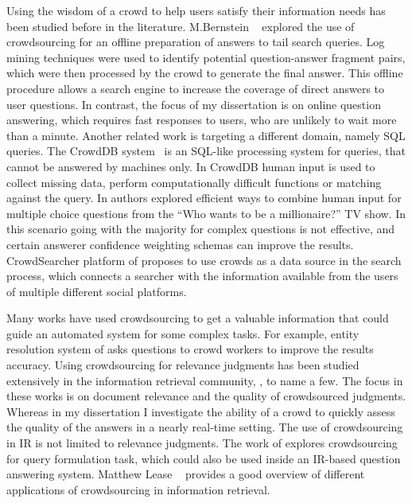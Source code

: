 Using the wisdom of a crowd to help users satisfy their information needs has been studied before in the literature.
M.Bernstein \etal~\cite{bernstein2012direct} explored the use of crowdsourcing for an offline preparation of answers to tail search queries.
Log mining techniques were used to identify potential question-answer fragment pairs, which were then processed by the crowd to generate the final answer.
This offline procedure allows a search engine to increase the coverage of direct answers to user questions.
In contrast, the focus of my dissertation is on online question answering, which requires fast responses to users, who are unlikely to wait more than a minute.
Another related work is targeting a different domain, namely SQL queries.
The CrowdDB system~\cite{franklin2011crowddb} is an SQL-like processing system for queries, that cannot be answered by machines only.
In CrowdDB human input is used to collect missing data, perform computationally difficult functions or matching against the query.
In \cite{aydin2014crowdsourcing} authors explored efficient ways to combine human input for multiple choice questions from the ``Who wants to be a millionaire?'' TV show.
In this scenario going with the majority for complex questions is not effective, and certain answerer confidence weighting schemas can improve the results.  
CrowdSearcher platform of \cite{Bozzon:2012:ASQ:2187836.2187971} proposes to use crowds as a data source in the search process, which connects a searcher with the information available from the users of multiple different social platforms.

Many works have used crowdsourcing to get a valuable information that could guide an automated system for some complex tasks.
For example, entity resolution system of \cite{Whang:2013:QSC:2536336.2536337} asks questions to crowd workers to improve the results accuracy.
Using crowdsourcing for relevance judgments has been studied extensively in the information retrieval community, \eg, \cite{alonso2011design,Alonso:2008:CRE:1480506.1480508,grady2010crowdsourcing} to name a few.
The focus in these works is on document relevance and the quality of crowdsourced judgments.
Whereas in my dissertation I investigate the ability of a crowd to quickly assess the quality of the answers in a nearly real-time setting.
The use of crowdsourcing in IR is not limited to relevance judgments.
The work of \cite{harris2013comparing} explores crowdsourcing for query formulation task, which could also be used inside an IR-based question answering system.
Matthew Lease \etal~\cite{lease2013crowdsourcing} provides a good overview of different applications of crowdsourcing in information retrieval.

